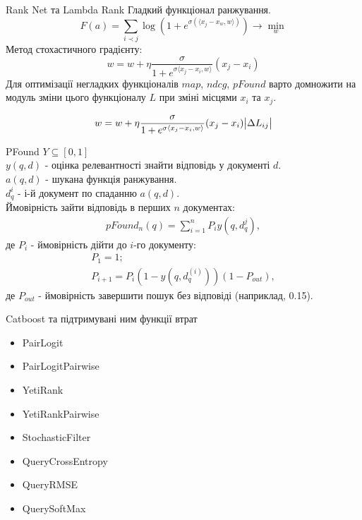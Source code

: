 \documentclass[10pt]{beamer}
\newcommand{\ip}[2]{{\langle #1, #2 \rangle}}
\begin{document}
\begin{frame}{Rank Net та Lambda Rank}
Гладкий функціонал ранжування.
\begin{equation}
F(a) = \sum_{i \prec j}{\log{(1 + e^{\sigma(\ip{x_{j} - x_{w}}{w})})}} \rightarrow \min_{w}
\end{equation}
Метод стохастичного градієнту:
\begin{equation}
w = w + \eta\frac{\sigma}{1 + e^{\sigma\ip{x_{j} - x_{i}}{w}}}(x_{j} - x_{i})
\end{equation}
Для оптимізації негладких функціоналів $map$, $ndcg$, $pFound$ варто домножити на модуль зміни цього функціоналу $L$ при зміні місцями $x_{i}$ та $x_{j}$.

\begin{equation}
w = w + \eta\frac{\sigma}{1 + e^{\sigma\ip{x_{j} - x_{i}}{w}}}(x_{j} - x_{i}) \abs{\Delta L_{ij}}
\end{equation}
\end{frame}

\begin{frame}{PFound}
$Y \subseteq [0, 1]$\\
$y(q, d)$ - оцінка релевантності знайти відповідь у документі $d$.\\
$a(q, d)$ - шукана функція ранжування.\\
$d_{q}^{i}$ - $і$-й документ по спаданню $a(q, d)$.\\
Ймовірність зайти відповідь в перших $n$ документах:
\begin{align}
pFound_{n}(q) = \sum_{i=1}^{n}{P_{i}y(q, d_{q}^{j})},
\end{align}
де $P_{i}$ - ймовірність дійти до $i$-го документу:
\begin{align}
P_{1} = 1;\\
P_{i + 1} = P_{i}(1 - y(q, d_{q}^(i)))(1 - P_{out}),
\end{align}
де $P_{out}$ - ймовірність завершити пошук без відповіді (наприклад, 0.15).
\end{frame}

\begin{frame}{Catboost та підтримувані ним функції втрат}
\begin{itemize}
    \item PairLogit
    \item PairLogitPairwise
    \item YetiRank
    \item YetiRankPairwise
    \item StochasticFilter
    \item QueryCrossEntropy
    \item QueryRMSE
    \item QuerySoftMax
\end{itemize}
\end{frame}
\end{document}
